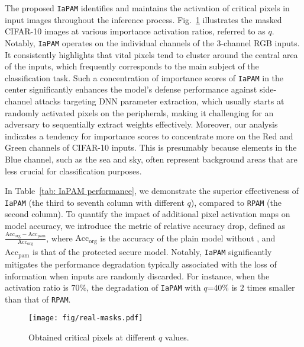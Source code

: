 The proposed \texttt{IaPAM} identifies and maintains the activation of critical pixels in input images throughout the inference process.
Fig.~\ref{fig: masks-for-cifar} illustrates the masked CIFAR-10 images at various importance activation ratios, referred to as $q$.
Notably, \texttt{IaPAM} operates on the individual channels of the 3-channel RGB inputs.
It consistently highlights that vital pixels tend to cluster around the central area of the inputs, which frequently corresponds to the main subject of the classification task.
Such a concentration of importance scores of \texttt{IaPAM} in the center significantly enhances the model's defense performance against side-channel attacks targeting DNN parameter extraction, which usually starts at randomly activated pixels on the peripherals, making it challenging for an adversary to sequentially extract weights effectively.
Moreover, our analysis indicates a tendency for importance scores to concentrate more on the Red and Green channels of CIFAR-10 inputs.
This is presumably because elements in the Blue channel, such as the sea and sky, often represent background areas that are less crucial for classification purposes.


In Table~\ref{tab: IaPAM performance}, we demonstrate the superior effectiveness of \texttt{IaPAM} (the third to seventh column with different $q$), compared to \texttt{RPAM} (the second column).
To quantify the impact of additional pixel activation maps on model accuracy, we introduce the metric of relative accuracy drop, defined as $\frac{\text{Acc}_{\text{org}} - \text{Acc}_{\text{pam}}}{\text{Acc}_{\text{org}}}$, where $\text{Acc}_\text{org}$ is the accuracy of the plain model without \method, and $\text{Acc}_\text{pam}$ is that of the protected secure model.
Notably, \texttt{IaPAM} significantly mitigates the performance degradation typically associated with the loss of information when inputs are randomly discarded.
For instance, when the activation ratio is $70\%$, the degradation of \texttt{IaPAM} with $q$=40\% is $2$ times smaller than that of \texttt{RPAM}.

\begin{figure}[h]
    \centering
    \texttt{[image: fig/real-masks.pdf]}
    \caption{Obtained critical pixels at different $q$ values.}
    \label{fig: masks-for-cifar}
\end{figure}

